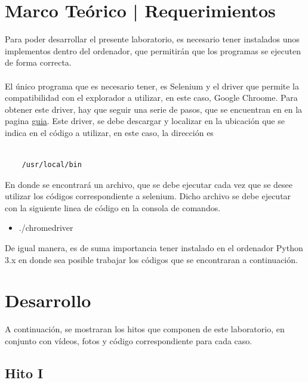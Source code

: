 \documentclass{article}
\begin{document}
\section{Marco Teórico | Requerimientos}
Para poder desarrollar el presente laboratorio, es necesario tener instalados unos implementos dentro del ordenador, que permitirán
que los programas se ejecuten de forma correcta. 
\\\\
El único programa que es necesario tener, es Selenium y el driver que permite la compatibilidad con el explorador a utilizar, en este caso, 
Google Chroome. Para obtener este driver, hay que seguir una serie de pasos, que se encuentran en en la pagina \href{https://sites.google.com/chromium.org/driver/}{guia}.
Este driver, se debe descargar y localizar en la ubicación que se indica en el código a utilizar, en este caso, la dirección es 
\\\\
\begin{verbatim}
    /usr/local/bin
\end{verbatim}
En donde se encontrará un archivo, que se debe ejecutar cada vez que se desee utilizar los códigos correspondiente a selenium. Dicho archivo se debe ejecutar
con la siguiente linea de código en la consola de comandos. 
\begin{itemize}
    \item ./chromedriver
\end{itemize}
De igual manera, es de suma importancia tener instalado en el ordenador Python 3.x en donde sea posible trabajar los códigos que se encontraran a continuación. 


\newpage
\section{Desarrollo}
    A continuación, se mostraran los hitos que componen de este laboratorio, en conjunto con vídeos,
    fotos y código correspondiente para cada caso. 

\subsection{Hito I}
\end{document}
